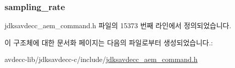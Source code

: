 \subsubsection[{\texorpdfstring{sampling\+\_\+rate}{sampling_rate}}]{ sampling\+\_\+rate}\hypertarget{structjdksavdecc__aem__command__get__sampling__rate__response_ab17c387eb7798bbb74ccfedd6f4cf21b}{}\label{structjdksavdecc__aem__command__get__sampling__rate__response_ab17c387eb7798bbb74ccfedd6f4cf21b}


jdksavdecc\+\_\+aem\+\_\+command.\+h 파일의 15373 번째 라인에서 정의되었습니다.



이 구조체에 대한 문서화 페이지는 다음의 파일로부터 생성되었습니다.\+:\begin{DoxyCompactItemize}
\item 
avdecc-\/lib/jdksavdecc-\/c/include/\hyperlink{jdksavdecc__aem__command_8h}{jdksavdecc\+\_\+aem\+\_\+command.\+h}\end{DoxyCompactItemize}
